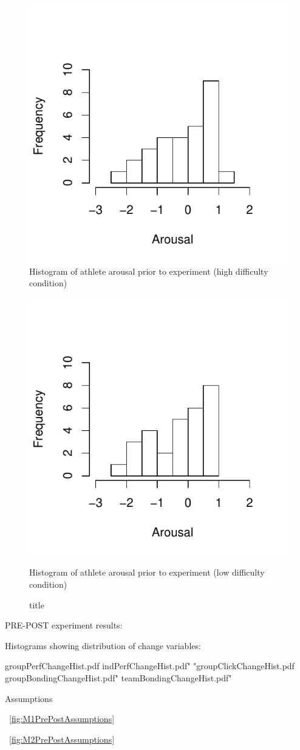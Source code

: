 \begin{figure}
  \centering
      \includegraphics[width=0.5\linewidth,keepaspectratio] {images/histArousalFactorPreHigh-1}
      \caption{Histogram of athlete arousal prior to experiment (high difficulty condition)}
        \label{fig:histArousalFactorPreHigh}
    \end{figure}

\begin{figure}
  \centering
  \includegraphics[width=0.5\linewidth,keepaspectratio] {images/histArousalFactorPreLow-1}
      \caption{Histogram of athlete arousal prior to experiment (low difficulty condition)}
  \caption{title}
    \label{fig:histArousalFactorPreLow}
\end{figure}














PRE-POST experiment results:

Histograms showing distribution of change variables:

groupPerfChangeHist.pdf
indPerfChangeHist.pdf"
"groupClickChangeHist.pdf
groupBondingChangeHist.pdf"
teamBondingChangeHist.pdf"



Assumptions

~\ref{fig:M1PrePostAssumptions}


~\ref{fig:M2PrePostAssumptions}
